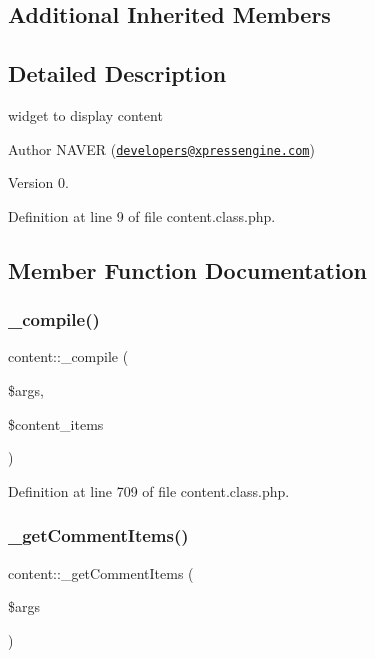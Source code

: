 \subsection*{Additional Inherited Members}


\subsection{Detailed Description}
widget to display content 

\begin{DoxyAuthor}{Author}
N\+A\+V\+ER (\href{mailto:developers@xpressengine.com}{\tt developers@xpressengine.\+com}) 
\end{DoxyAuthor}
\begin{DoxyVersion}{Version}
0. 
\end{DoxyVersion}


Definition at line 9 of file content.\+class.\+php.



\subsection{Member Function Documentation}
\hypertarget{classcontent_a297e1dd4d257abab532a9a9d99847ee8}{}\label{classcontent_a297e1dd4d257abab532a9a9d99847ee8} 
\subsubsection{\texorpdfstring{\+\_\+compile()}{\_compile()}}
{\footnotesize\ttfamily content\+::\+\_\+compile (\begin{DoxyParamCaption}\item[{}]{\$args,  }\item[{}]{\$content\+\_\+items }\end{DoxyParamCaption})}



Definition at line 709 of file content.\+class.\+php.

\hypertarget{classcontent_a257f112a3719c28356bd49c336d3ad2f}{}\label{classcontent_a257f112a3719c28356bd49c336d3ad2f} 
\subsubsection{\texorpdfstring{\+\_\+get\+Comment\+Items()}{\_getCommentItems()}}
{\footnotesize\ttfamily content\+::\+\_\+get\+Comment\+Items (\begin{DoxyParamCaption}\item[{}]{\$args }\end{DoxyParamCaption})}



